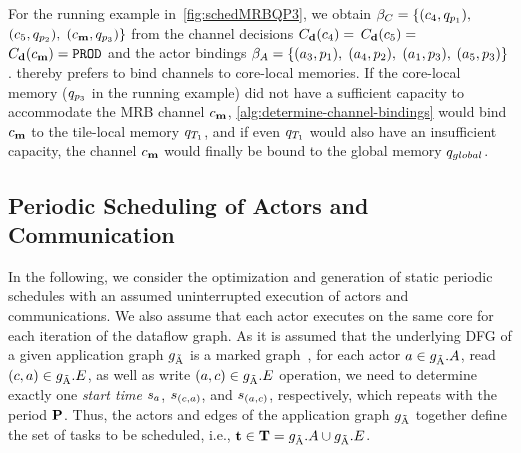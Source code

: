 For the running example in~\cref{fig:schedMRBQP3}, we obtain $\beta_C = \{(c_4,q_{p_1}),$ $(c_5,q_{p_2}),$ $(\GenMRB,\memory_{\core_3})\}$ from the channel decisions $C_\mathtt{\mathbf{d}}(c_4) =$ $C_\mathtt{\mathbf{d}}(c_5) =$ $\ChannelDecisions(\GenMRB) = \texttt{PROD}$ and the actor bindings $\beta_A = \{(a_3,p_1),$ $(a_4,p_2),$ $(a_1,p_3),$ $(a_5,p_3)\}$.
 thereby prefers to bind channels to core-local memories.
If the core-local memory ($q_{p_3}$ in the running example) did not have a sufficient capacity to accommodate the \ac{MRB} channel $\GenMRB$, \cref{alg:determine-channel-bindings} would bind $\GenMRB$ to the tile-local memory $q_{T_1}$, and if even $q_{T_1}$ would also have an insufficient capacity, the channel $\GenMRB$ would finally be bound to the global memory $q_{global}$.

\subsection{Periodic Scheduling of Actors and Communication}
In the following, we  consider the optimization and generation of static periodic schedules with an assumed uninterrupted execution of actors and communications.
We also assume that each actor executes on the same core for each iteration of the dataflow graph.
As it is assumed that the underlying \ac{DFG} of a given application graph $g_{\tilde{\textrm{A}}}$ is a marked graph~\cite{chep_1971-marked-graphs}, for each actor $a \in g_{\tilde{\textrm{A}}}.A$, read $(c,a) \in g_{\tilde{\textrm{A}}}.E$, as well as write $(a,c) \in g_{\tilde{\textrm{A}}}.E$ operation, we need to determine exactly one \emph{start time} $s_a$, $s_{(c,a)}$, and $s_{(a,c)}$, respectively, which repeats with the period $\mathbf{P}$.
Thus, the actors and edges of the application graph $g_{\tilde{\textrm{A}}}$ together define the set of tasks to be scheduled, i.e., $\mathbf{t} \in \mathbf{T} = g_{\tilde{\textrm{A}}}.A \cup g_{\tilde{\textrm{A}}}.E$.

